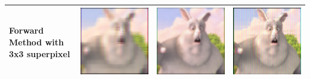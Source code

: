 \begin{table}[]
\begin{tabular}{| p{4 cm} | p{4cm} | p{4cm} | p{4cm} |}
    \hline Forward Method with 3x3 superpixel & \includegraphics[width = 4 cm]{chapters/chapter9/images/simulation/3x3_prefilter.png} &
         \includegraphics[width = 4 cm]{chapters/chapter9/images/simulation/3x3_pinhole_simulation.png} &  
         \includegraphics[width = 4 cm]{chapters/chapter9/images/simulation/3x3_lens_simulation.png} \\ \hline
  \end{tabular}
\end{table}

